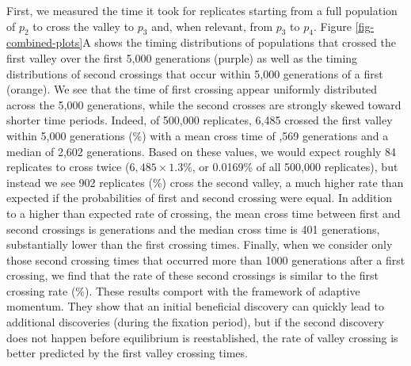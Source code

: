 First, we measured the time it took for replicates starting from a full population of $p_{2}$ to cross the valley to $p_{3}$ and, when relevant, from $p_{3}$ to $p_{4}$.
Figure \ref{fig-combined-plots}A
shows the timing distributions of populations that crossed the first valley over the first 5,000 generations (purple) as well as the timing distributions of second crossings that occur within 5,000 generations of a first (orange). 
We see that the time of first crossing appear uniformly distributed across the 5,000 generations, while the second crosses are strongly skewed toward shorter time periods. 
Indeed, of 500,000 replicates, 6,485 crossed the first valley within 5,000 generations (\%) with a mean cross time of ,569 generations and a median of 2,602 generations. 
Based on these values, we would expect roughly 84 replicates to cross twice ($6,485 \times 1.3\%$, or 0.0169\% of all 500,000 replicates), but instead we see 902 replicates (\%) cross the second valley, a much higher rate than expected if the probabilities of first and second crossing were equal.
In addition to a higher than expected rate of crossing, the mean cross time between first and second crossings is  generations and the median cross time is 401 generations, substantially lower than the first crossing times. 
Finally, when we consider only those second crossing times that occurred more than 1000 generations after a first crossing, we find that the rate of these second crossings is similar to the first crossing rate (\%).
These results comport with the framework of adaptive momentum. 
They show that an initial beneficial discovery can quickly lead to additional discoveries (during the fixation period), but if the second discovery does not happen before equilibrium is reestablished, the rate of valley crossing is better predicted by the first valley crossing times. 




